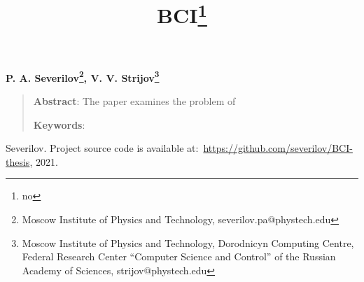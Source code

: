 \documentclass[12pt]{article}
\begin{document}
 
\title{BCI\thanks{no}}
\date{}
\maketitle

\begin{center}
\bf
P. A. Severilov\footnote{Moscow Institute of Physics and Technology, severilov.pa@phystech.edu},
V. V. Strijov\footnote{Moscow Institute of Physics and Technology, Dorodnicyn Computing Centre, Federal Research Center “Computer Science and Control” of the Russian Academy of Sciences, strijov@phystech.edu}
\end{center}

{\centering\begin{quote}
\textbf{Abstract}: 
The paper examines the problem of  


	
\smallskip
\textbf{Keywords}: 
\end{quote}
}

\begin{otherlanguage}{english}

\begin{thebibliography}{99}



Severilov. Project source code is available at:~\url{https://github.com/severilov/BCI-thesis}, 2021.
		
\end{thebibliography}
\end{otherlanguage}
\end{document}
